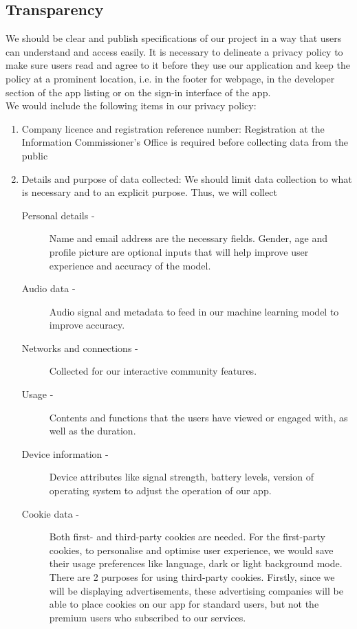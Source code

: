 \subsection{Transparency}
We should be clear and publish specifications of our project in a way that users can understand and access
easily. It is necessary to delineate a privacy policy to make sure users read and agree to it before they use
our application and keep the policy at a prominent location, i.e. in the footer for webpage, in the developer
section of the app listing or on the sign-in interface of the app.\\We would include the following items in our privacy policy:
\begin{enumerate}
    \item Company licence and registration reference number: Registration at the Information Commissioner's Office is required
    before collecting data from the public
    \item Details and purpose of data collected: We should limit data collection to what is necessary and to an explicit purpose.
    Thus, we will collect
    \begin{description}
        \item[Personal details -] Name and email address are the necessary fields. Gender, age and profile picture are optional inputs 
        that will help improve user experience and accuracy of the model. 
        \item[Audio data -] Audio signal and metadata to feed in our machine learning model to improve accuracy.
        \item[Networks and connections -] Collected for our interactive community features.
        \item[Usage -] Contents and functions that the users have viewed or engaged with, as well as the duration.
        \item[Device information -] Device attributes like signal strength, battery levels, version of operating system to adjust the operation of our app.
        \item[Cookie data -] Both first- and third-party cookies are needed. For the first-party cookies, to personalise and optimise user
        experience, we would save their usage preferences like language, dark or light background mode. 
        \\There are 2 purposes for using third-party cookies. Firstly, since we will be displaying advertisements, 
        these advertising companies will be able to place cookies on our app for standard users, but not the premium users who subscribed to our services. 

\end{description}
\end{enumerate}
